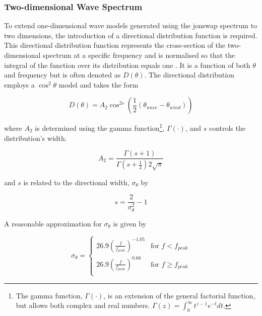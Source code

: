 \subsubsection{Two-dimensional Wave Spectrum} \label{subsubsec:theory.waves.modelling.2D}

To extend one-dimensional wave models generated using the \acs{jonswap} spectrum to two dimensions, the introduction of a directional distribution function is required. This directional distribution function represents the cross-section of the two-dimensional spectrum at a specific frequency and is normalised so that the integral of the function over its distribution equals one \cite{Holthuijsen2007}. It is a function of both $\theta$ and frequency but is often denoted as $D(\theta)$. The directional distribution employs a $\cos^{2}\theta$ model \cite{Holthuijsen2007} and takes the form

\begin{equation} \label{eq:directionalDistributionFunc}
    D(\theta) = A_{2} \cos^{2s} \left ( \frac{1}{2} (\theta_{wave} - \theta_{wind}) \right )
\end{equation}

where $A_{2}$ is determined using the gamma function\footnote{The gamma function, $\Gamma(\cdot)$, is an extension of the general factorial function, but allows both complex and real numbers. $\Gamma(z) = \int_{0}^{\infty}t^{z-1}e^{-t}dt$.}, $\Gamma(\cdot)$, and $s$ controls the distribution's width. 

\begin{equation} \label{eq:directionalDistributionFunc.A2}
    A_{2} = \frac{\Gamma(s+1)}{\Gamma \left ( s + \frac{1}{2} \right )2\sqrt{\pi}}
\end{equation}

and $s$ is related to the directional width, $\sigma_{\theta}$ by

\begin{equation} \label{eq:directionalDistributionFunc.sigTh}
    s = \frac{2}{\sigma_{\theta}^{2}} - 1
\end{equation}

A reasonable approximation for $\sigma_{\theta}$ is given by

\begin{equation*}
  \sigma_{\theta} =
    \begin{cases}
      26.9 \left ( \frac{f}{f_{peak}} \right ) ^{-1.05} & \text{for $f < f_{peak}$}\\
      26.9 \left ( \frac{f}{f_{peak}} \right ) ^{0.68} & \text{for $f \geq f_{peak}$}\\
    \end{cases}       
\end{equation*}


